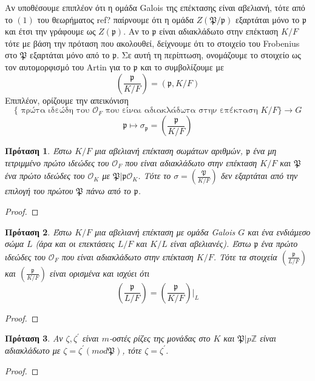 \documentclass[oneside,a4paper]{article}
\newtheorem{prop}{Πρόταση}
\newcommand {\tl}{\textlatin}
\newcommand{\Z}{\mathbb{Z}}
\begin{document}
Αν υποθέσουμε επιπλέον ότι η ομάδα \tl{Galois} της επέκτασης είναι αβελιανή, τότε από το $(1)$ του θεωρήματος \tl{ref}? παίρνουμε ότι η ομάδα $Z(\mathfrak{P}/\mathfrak{p})$ εξαρτάται μόνο το $\mathfrak{p}$ και έτσι την γράφουμε ως $Z(\mathfrak{p})$. Αν το $\mathfrak{p}$ είναι αδιακλάδωτο στην επέκταση $K/F$ τότε με βάση την πρόταση που ακολουθεί, δείχνουμε ότι το στοιχείο του \tl{Frobenius} στο $\mathfrak{P}$ εξαρτάται μόνο από το $\mathfrak{p}$. Σε αυτή τη περίπτωση, ονομάζουμε το στοιχείο ως τον αυτομορφισμό του \tl{Artin} για το $\mathfrak{p}$ και το συμβολίζουμε με $$\left(\frac{\mathfrak{p}}{K/F}\right) = (\mathfrak{p},K/F)$$ Επιπλέον, ορίζουμε την απεικόνιση 
$$\{\text{ πρώτα ιδεώδη του } \mathcal{O}_F \text{ που είναι αδιακλάδωτα στην επέκταση } K/F\} \longrightarrow G$$
$$\mathfrak{p} \longmapsto \sigma_{\mathfrak{p}} = \left(\frac{\mathfrak{p}}{K/F}\right)$$




\begin{prop}
	Έστω $K/F$ μια αβελιανή επέκταση σωμάτων αριθμών, $\mathfrak{p}$ ένα μη τετριμμένο πρώτο ιδεώδες του $\mathcal{O}_F$ που είναι αδιακλάδωτο στην επέκταση $K/F$ και $\mathfrak{P}$ ένα πρώτο ιδεώδες του $\mathcal{O}_K$ με $\mathfrak{P}| \mathfrak{p} \mathcal{O}_K$. Τότε το $\sigma = \left(\frac{\mathfrak{P}}{K/F}\right)$ δεν εξαρτάται από την επιλογή του πρώτου $\mathfrak{P}$ πάνω από το $\mathfrak{p}$.
\end{prop}

\begin{proof}
\end{proof}

\begin{prop}
	Έστω $K/F$ μια αβελιανή επέκταση με ομάδα \tl{Galois} $G$ και ένα ενδιάμεσο σώμα $L$ (άρα και οι επεκτάσεις $L/F$ και $K/L$ είναι αβελιανές). Έστω $\mathfrak{p}$ ένα πρώτο ιδεώδες του $\mathcal{O}_F$ που είναι αδιακλάδωτο στην επέκταση $K/F$. Τότε τα στοιχεία $\left(\frac{\mathfrak{p}}{L/F}\right)$ και $\left(\frac{\mathfrak{p}}{K/F}\right)$ είναι ορισμένα και ισχύει ότι $$\left(\frac{\mathfrak{p}}{L/F}\right) = \left(\frac{\mathfrak{p}}{K/F}\right)\bigg|_L$$ 
\end{prop}

\begin{proof}%
\end{proof}


\begin{prop}
	Αν $\zeta,\zeta^{\prime}$ είναι $m$-οστές ρίζες της μονάδας στο $K$ και $\mathfrak{P}|p\Z$ είναι αδιακλάδωτο με $\zeta = \zeta^{\prime} (mod \mathfrak{P})$, τότε $\zeta = \zeta^{\prime}$.
\end{prop}
\begin{proof}
\end{proof}
\end{document}

